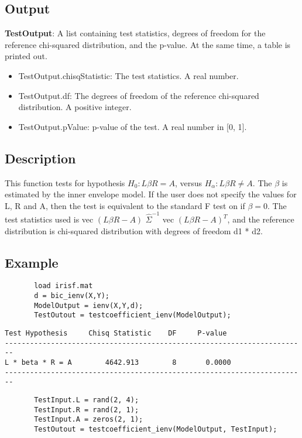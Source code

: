 \documentclass[a4paper,11pt,openany]{memoir}
\begin{document}
\subsection*{Output}

\begin{par}
\textbf{TestOutput}: A list containing test statistics, degrees of freedom for the reference chi-squared distribution, and the p-value.  At the same time, a table is printed out.
\end{par} \vspace{1em}
\begin{itemize}
\setlength{\itemsep}{-1ex}
   \item TestOutput.chisqStatistic: The test statistics. A real number.
   \item TestOutput.df: The degrees of freedom of the reference chi-squared distribution.  A positive integer.
   \item TestOutput.pValue: p-value of the test.  A real number in [0, 1].
\end{itemize}


\subsection*{Description}

\begin{par}
This function tests for hypothesis $H_0: L\beta R = A$, versus $H_\alpha: L\beta R\neq A$.  The $\beta$ is estimated by the inner envelope model.  If the user does not specify the values for L, R and A, then the test is equivalent to the standard F test on if $\beta = 0$.  The test statistics used is vec $(L\beta R - A)$ $\hat{\Sigma}^{-1}$ vec $(L\beta R - A)^{T}$, and the reference distribution is chi-squared distribution with degrees of freedom d1 * d2.
\end{par} \vspace{1em}


\subsection*{Example}


\begin{verbatim}       load irisf.mat
       d = bic_ienv(X,Y);
       ModelOutput = ienv(X,Y,d);
       TestOutout = testcoefficient_ienv(ModelOutput);\end{verbatim}
       
        \color{lightgray}\ttfamily \begin{verbatim}
Test Hypothesis     Chisq Statistic    DF     P-value
------------------------------------------------------------------------
L * beta * R = A        4642.913        8       0.0000
------------------------------------------------------------------------
\end{verbatim} \rmfamily
\color{black}
\begin{verbatim}       TestInput.L = rand(2, 4);
       TestInput.R = rand(2, 1);
       TestInput.A = zeros(2, 1);
       TestOutout = testcoefficient_ienv(ModelOutput, TestInput);\end{verbatim}
    
\end{document}
